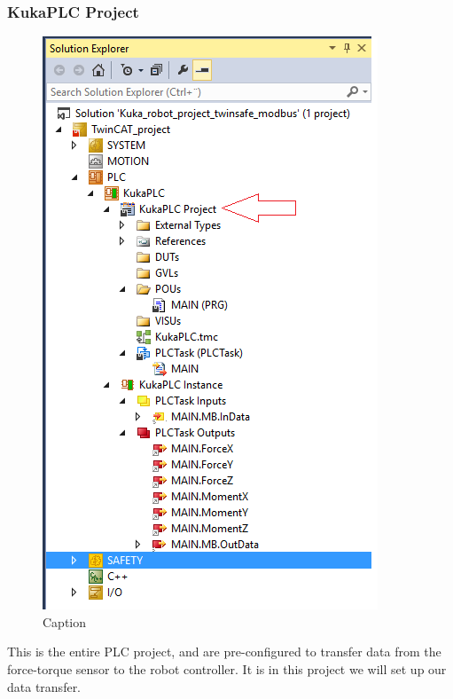 \documentclass{article}
\begin{document}
\newpage

\subsubsection{KukaPLC Project}
\begin{figure}[!h]
    \centering
    \includegraphics[scale=0.7]{pictures/TC3_overview/TC3_KukaPLC.png}
    \caption{Caption}
    \label{fig:my_label}
\end{figure}
This is the entire PLC project, and are pre-configured to transfer data from the force-torque sensor to the robot controller. It is in this project we will set up our data transfer.  

\newpage
\end{document}
